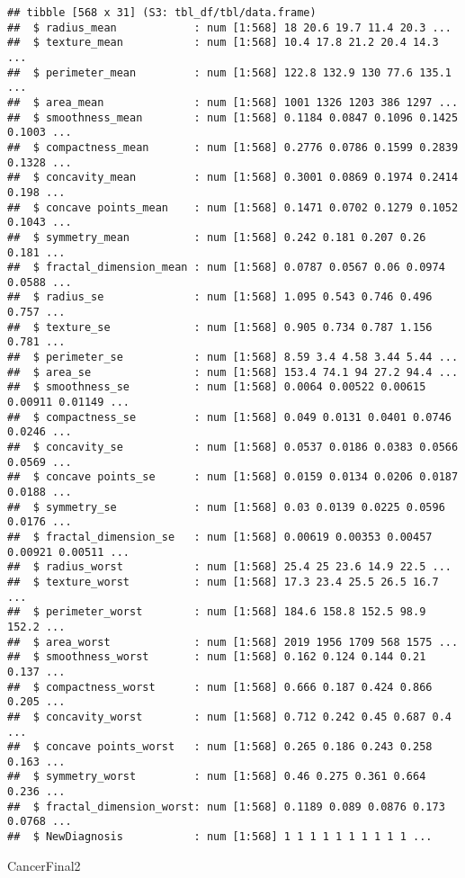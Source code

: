 \documentclass[
]{article}
\newenvironment{Shaded}{\begin{snugshade}}{\end{snugshade}}
\newcommand{\NormalTok}[1]{#1}
\begin{document}
\begin{verbatim}
## tibble [568 x 31] (S3: tbl_df/tbl/data.frame)
##  $ radius_mean            : num [1:568] 18 20.6 19.7 11.4 20.3 ...
##  $ texture_mean           : num [1:568] 10.4 17.8 21.2 20.4 14.3 ...
##  $ perimeter_mean         : num [1:568] 122.8 132.9 130 77.6 135.1 ...
##  $ area_mean              : num [1:568] 1001 1326 1203 386 1297 ...
##  $ smoothness_mean        : num [1:568] 0.1184 0.0847 0.1096 0.1425 0.1003 ...
##  $ compactness_mean       : num [1:568] 0.2776 0.0786 0.1599 0.2839 0.1328 ...
##  $ concavity_mean         : num [1:568] 0.3001 0.0869 0.1974 0.2414 0.198 ...
##  $ concave points_mean    : num [1:568] 0.1471 0.0702 0.1279 0.1052 0.1043 ...
##  $ symmetry_mean          : num [1:568] 0.242 0.181 0.207 0.26 0.181 ...
##  $ fractal_dimension_mean : num [1:568] 0.0787 0.0567 0.06 0.0974 0.0588 ...
##  $ radius_se              : num [1:568] 1.095 0.543 0.746 0.496 0.757 ...
##  $ texture_se             : num [1:568] 0.905 0.734 0.787 1.156 0.781 ...
##  $ perimeter_se           : num [1:568] 8.59 3.4 4.58 3.44 5.44 ...
##  $ area_se                : num [1:568] 153.4 74.1 94 27.2 94.4 ...
##  $ smoothness_se          : num [1:568] 0.0064 0.00522 0.00615 0.00911 0.01149 ...
##  $ compactness_se         : num [1:568] 0.049 0.0131 0.0401 0.0746 0.0246 ...
##  $ concavity_se           : num [1:568] 0.0537 0.0186 0.0383 0.0566 0.0569 ...
##  $ concave points_se      : num [1:568] 0.0159 0.0134 0.0206 0.0187 0.0188 ...
##  $ symmetry_se            : num [1:568] 0.03 0.0139 0.0225 0.0596 0.0176 ...
##  $ fractal_dimension_se   : num [1:568] 0.00619 0.00353 0.00457 0.00921 0.00511 ...
##  $ radius_worst           : num [1:568] 25.4 25 23.6 14.9 22.5 ...
##  $ texture_worst          : num [1:568] 17.3 23.4 25.5 26.5 16.7 ...
##  $ perimeter_worst        : num [1:568] 184.6 158.8 152.5 98.9 152.2 ...
##  $ area_worst             : num [1:568] 2019 1956 1709 568 1575 ...
##  $ smoothness_worst       : num [1:568] 0.162 0.124 0.144 0.21 0.137 ...
##  $ compactness_worst      : num [1:568] 0.666 0.187 0.424 0.866 0.205 ...
##  $ concavity_worst        : num [1:568] 0.712 0.242 0.45 0.687 0.4 ...
##  $ concave points_worst   : num [1:568] 0.265 0.186 0.243 0.258 0.163 ...
##  $ symmetry_worst         : num [1:568] 0.46 0.275 0.361 0.664 0.236 ...
##  $ fractal_dimension_worst: num [1:568] 0.1189 0.089 0.0876 0.173 0.0768 ...
##  $ NewDiagnosis           : num [1:568] 1 1 1 1 1 1 1 1 1 1 ...
\end{verbatim}

\begin{Shaded}
\begin{Highlighting}[]
\NormalTok{CancerFinal2}
\end{Highlighting}
\end{Shaded}
\end{document}
